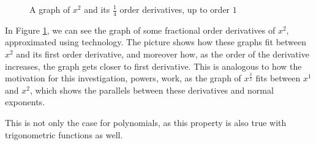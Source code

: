 \documentclass{article}
\begin{document}
\begin{figure}[H]
\def\figonexmax{15}
\centering
{}
\caption{A graph of $x^2$ and its $\frac{1}{4}$ order derivatives, up to order $1$} \label{xsquaredgraph}
\end{figure}

In Figure \ref{xsquaredgraph}, we can see the graph of some fractional order
derivatives of $x^2$, approximated using technology. The picture shows how
these graphs fit between $x^2$ and its first order derivative, and moreover
how, as the order of the derivative increases, the graph gets closer to first
derivative. This is analogous to how the motivation for this investigation,
powers, work, as the graph of $x^\frac{3}{2}$ fits between $x^1$ and $x^2$,
which shows the parallels between these derivatives and normal exponents.

This is not only the case for polynomials, as this property is also true with
trigonometric functions as well.
\end{document}
